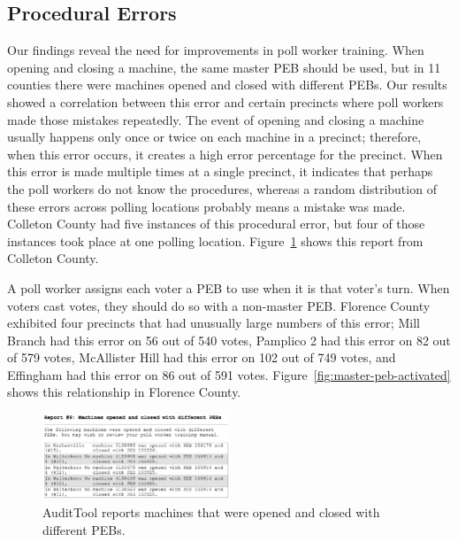 \documentclass[letterpaper,twocolumn,10pt]{article}
\begin{document}
\subsection{Procedural Errors}
Our findings reveal the need for improvements in poll worker training. When
opening and closing a machine, the same master PEB should be used, but in 11
counties there were machines opened and closed with different PEBs. Our results
showed a correlation between this error and certain precincts where poll workers
made those mistakes repeatedly. The event of opening and closing a machine 
usually happens only once or twice on each machine in a precinct; therefore, 
when this error occurs, it creates a high error percentage for the precinct. 
When this error is made multiple times at a single precinct, it indicates 
that perhaps the poll workers do
not know the procedures, whereas a random distribution of these errors across
polling locations probably means a mistake was made. Colleton County had five
instances of this procedural error, but four of those instances took place at
one polling location. Figure~\ref{fig:diff-pebs-open-close} shows this report
from Colleton County.  

A poll worker assigns each voter a PEB to use when it is that voter's turn. When 
voters cast votes, they should do so with a non-master PEB. Florence County exhibited 
four precincts that had unusually large numbers of this error; Mill Branch had 
this error on 56 out of 540 votes, Pamplico 2 had this error on 82 out of 579 
votes, McAllister Hill had this error on 102 out of 749 votes, and Effingham 
had this error on 86 out of 591 votes. Figure~\ref{fig:master-peb-activated} 
shows this relationship in Florence County. 

\begin{figure}[htbp]
\begin{center}
    \includegraphics[width=0.5\textwidth,height=0.2\textheight]{OpenClosePEBs.eps}
\end{center}
\caption{AuditTool reports machines that were opened and closed with different PEBs.}
\label{fig:diff-pebs-open-close}
\end{figure}
\end{document}
